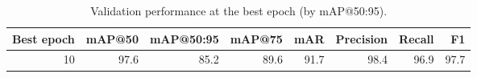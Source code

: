 \begin{table}
\caption{Validation performance at the best epoch (by mAP@50:95).}
\label{tab:rfdetr_results}
\begin{tabular}{rrrrrrrr}
\toprule
Best epoch & mAP@50 & mAP@50:95 & mAP@75 & mAR & Precision & Recall & F1 \\
\midrule
10 & 97.6 & 85.2 & 89.6 & 91.7 & 98.4 & 96.9 & 97.7 \\
\bottomrule
\end{tabular}
\end{table}
